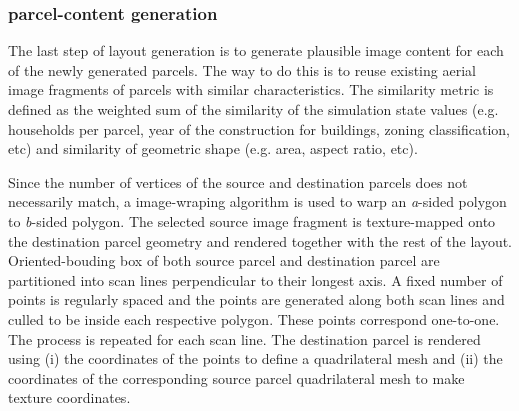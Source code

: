 \documentclass{egpubl}
\begin{document}
\subsubsection{parcel-content generation}
The last step of layout generation is to generate plausible image content for each of the newly generated parcels. The way to do this is to reuse existing aerial image fragments of parcels with similar characteristics. The similarity metric is defined as the weighted sum of the similarity of the simulation state values (e.g. households per parcel, year of the construction for buildings, zoning classification, etc) and similarity of geometric shape (e.g. area, aspect ratio, etc).

Since the number of vertices of the source and destination parcels does not necessarily match, a image-wraping algorithm is used to warp an \textit{a}-sided polygon to \textit{b}-sided polygon. The selected source image fragment is texture-mapped onto the destination parcel geometry and rendered together with the rest of the layout. Oriented-bouding box of both source parcel and destination parcel are partitioned into scan lines perpendicular to their longest axis. A fixed number of points is regularly spaced and the points are generated along both scan lines and culled to be inside each respective polygon. These points correspond one-to-one. The process is repeated for each scan line. The destination parcel is rendered using (i) the coordinates of the points to define a quadrilateral mesh and (ii) the coordinates of the corresponding source parcel quadrilateral mesh to make texture coordinates.
\end{document}
